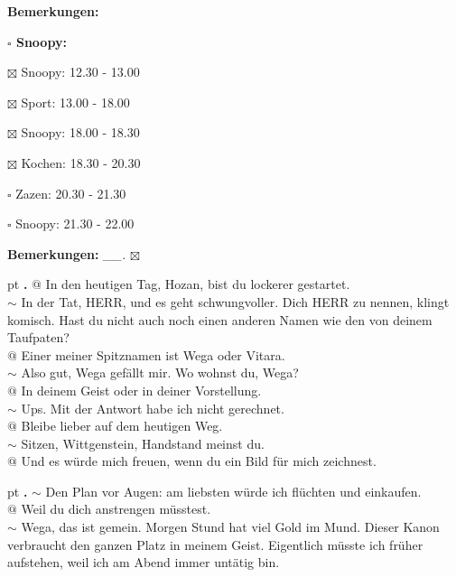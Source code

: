 \documentclass[10pt,a4paper]{article}
\newcounter{notec}
\newcommand\notep[1]{%
  \stepcounter{notec}
  \vskip #1pt
  {\bf\arabic{notec}.}
}
\newcommand\prop[1] {{\color {alizarin} {\bf #1}}}             %
\newcommand\mand[1] {{\color {burntorange} {\bf #1}}}          %
\newcommand\bottomspace{\vskip 4pt}
\newcommand\n[1] { {\sl #1.} \hskip 5pt }
\begin{document}
\begin{mdframed}[style=daystyle]
\begin{labeling}{{\mand {Bemerkungen:}}}
\begin{minipage}{0.75\textwidth}
\begin{labeling}{\prop {$\square$ {Snoopy:}}}
      \item[$\boxtimes$ Snoopy:] 12.30 - 13.00
      \item[$\boxtimes$ Sport:]  13.00 - 18.00
        
      \item[$\boxtimes$ Snoopy:] 18.00 - 18.30
      \item[$\boxtimes$ Kochen:] 18.30 - 20.30
        
      \item[$\square$ Zazen:]  20.30 - 21.30
      \item[$\square$ Snoopy:] 21.30 - 22.00
      \end{labeling}
    \end{minipage}
    \bottomspace
  \item[{\mand {Bemerkungen:}}]  \n{\_\_} $\boxtimes$
  \end{labeling}
    
  \setcounter{notec}{0}
  
  \notep 0 $@$ In den heutigen Tag, Hozan, bist du lockerer gestartet. \\
  $\sim$ In der Tat, HERR, und es geht schwungvoller. Dich HERR zu nennen,
  klingt komisch. Hast du nicht auch noch einen anderen Namen wie den von deinem
  Taufpaten? \\
  $@$ Einer meiner Spitznamen ist Wega oder Vitara. \\
  $\sim$ Also gut, Wega gefällt mir. Wo wohnst du, Wega? \\
  $@$ In deinem Geist oder in deiner Vorstellung. \\
  $\sim$ Ups. Mit der Antwort habe ich nicht gerechnet. \\
  $@$ Bleibe lieber auf dem heutigen Weg. \\
  $\sim$ Sitzen, Wittgenstein, Handstand meinst du. \\
  $@$ Und es würde mich freuen, wenn du ein Bild für mich zeichnest.

  \notep 0 $\sim$ Den Plan vor Augen: am liebsten würde ich flüchten und
  einkaufen. \\
  $@$ Weil du dich anstrengen müsstest. \\
  $\sim$ Wega, das ist gemein. Morgen Stund hat viel Gold im Mund. Dieser Kanon
  verbraucht den ganzen Platz in meinem Geist. Eigentlich müsste ich früher
  aufstehen, weil ich am Abend immer untätig bin.
  
\end{mdframed}
\end{document}
